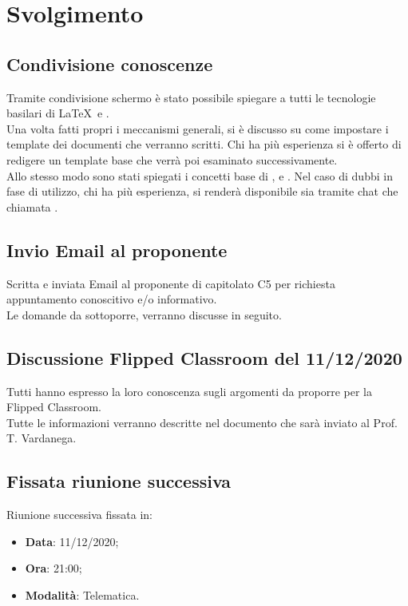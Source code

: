 \documentclass[]{article}
\begin{document}
\newpage

\section{Svolgimento}
\subsection{Condivisione conoscenze}
Tramite condivisione schermo è stato possibile spiegare a tutti le tecnologie basilari di \LaTeX\ e . \\
Una volta fatti propri i meccanismi generali, si è discusso su come impostare i template dei documenti che verranno scritti. Chi ha più esperienza si è offerto di redigere un template base che verrà poi esaminato successivamente.\\
Allo stesso modo sono stati spiegati i concetti base di ,  e . Nel caso di dubbi in fase di utilizzo, chi ha più esperienza, si renderà disponibile sia tramite chat che chiamata .

\subsection{Invio Email al proponente}
Scritta e inviata Email al proponente di capitolato C5 per richiesta appuntamento conoscitivo e/o informativo. \\
Le domande da sottoporre, verranno discusse in seguito.

\subsection{Discussione Flipped Classroom del 11/12/2020}
Tutti hanno espresso la loro conoscenza sugli argomenti da proporre per la Flipped Classroom.\\
Tutte le informazioni verranno descritte nel documento che sarà inviato al Prof. T. Vardanega.
\subsection{Fissata riunione successiva}
Riunione successiva fissata in:
\begin{itemize}
	\item \textbf{Data}: 11/12/2020;
	\item \textbf{Ora}: 21:00;
	\item \textbf{Modalità}: Telematica.
\end{itemize}


	
\end{document}
